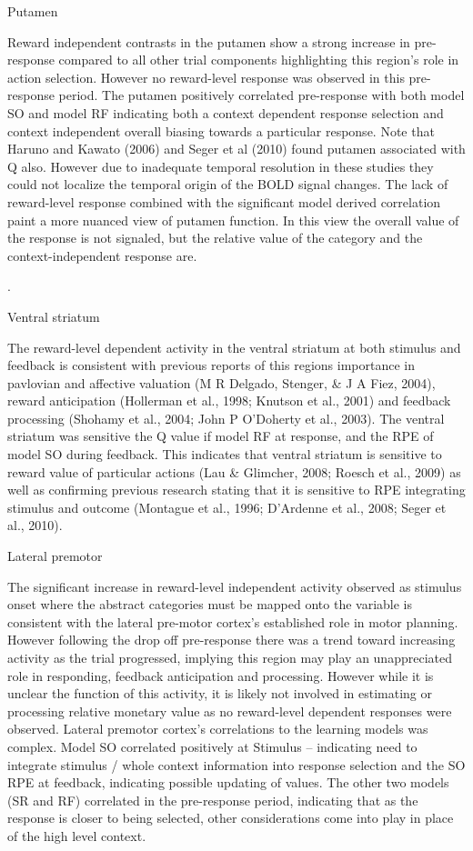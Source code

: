 Putamen

Reward independent contrasts in the putamen show a strong increase in pre-response compared to all other trial components highlighting this region’s role in action selection.  However no reward-level response was observed in this pre-response period. The putamen positively correlated pre-response with both model SO and model RF indicating both a context dependent response selection and context independent overall biasing towards a particular response. Note that Haruno and Kawato (2006) and Seger et al (2010) found putamen associated with Q also. However due to inadequate temporal resolution in these studies they could not localize the temporal origin of the BOLD signal changes.  The lack of reward-level response combined with the significant model derived correlation paint a more nuanced view of putamen function.  In this view the overall value of the response is not signaled, but the relative value of the category and the context-independent response are.

. 

Ventral striatum

The reward-level dependent activity in the ventral striatum at both stimulus and feedback  is consistent with previous reports of this regions importance in pavlovian and affective valuation (M R Delgado, Stenger, & J A Fiez, 2004), reward anticipation (Hollerman et al., 1998; Knutson et al., 2001) and feedback processing (Shohamy et al., 2004; John P O'Doherty et al., 2003).  The ventral striatum was sensitive the Q value if model RF at response, and the RPE of model SO during feedback.  This indicates that ventral striatum is sensitive to reward value of particular actions (Lau & Glimcher, 2008; Roesch et al., 2009) as well as confirming previous research stating that it is sensitive to RPE integrating stimulus and outcome (Montague et al., 1996; D'Ardenne et al., 2008; Seger et al., 2010).



Lateral premotor

The significant increase in reward-level independent activity observed as stimulus onset where the abstract categories must be mapped onto the variable is consistent with the lateral pre-motor cortex’s established role in motor planning.  However following the drop off pre-response there was a trend toward increasing activity as the trial progressed, implying this region may play an unappreciated role in responding, feedback anticipation and processing. However while it is unclear the function of this activity, it is likely not involved in estimating or processing relative monetary value as no reward-level dependent responses were observed.  Lateral premotor cortex’s correlations to the learning models was complex.  Model SO correlated positively at Stimulus -- indicating need to integrate stimulus / whole context information into response selection and the SO RPE at feedback, indicating possible updating of values. The other two models (SR and RF) correlated in the pre-response period, indicating that as the response is closer to being selected, other considerations come into play in place of the high level context.



